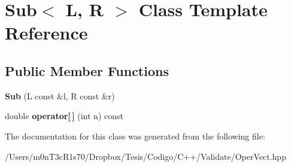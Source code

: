 \hypertarget{class_sub}{}\section{Sub$<$ L, R $>$ Class Template Reference}
\label{class_sub}
\subsection*{Public Member Functions}
\begin{DoxyCompactItemize}
\item 
\hypertarget{class_sub_acd0d5975e76c54c0e8de0fe6de16826a}{}\label{class_sub_acd0d5975e76c54c0e8de0fe6de16826a} 
{\bfseries Sub} (L const \&l, R const \&r)
\item 
\hypertarget{class_sub_a4cc27cf7ecc9a05f691a559813aa3919}{}\label{class_sub_a4cc27cf7ecc9a05f691a559813aa3919} 
double {\bfseries operator\mbox{[}$\,$\mbox{]}} (int n) const
\end{DoxyCompactItemize}


The documentation for this class was generated from the following file\+:\begin{DoxyCompactItemize}
\item 
/\+Users/m0n\+T3c\+R1s70/\+Dropbox/\+Tesis/\+Codigo/\+C++/\+Validate/Oper\+Vect.\+hpp\end{DoxyCompactItemize}
